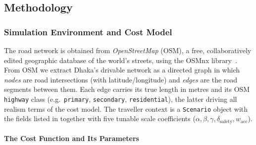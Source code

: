 \documentclass{ai-lab-report}
\begin{document}
\subsection{Methodology}

\subsubsection{Simulation Environment and Cost Model}
The road network is obtained from \emph{OpenStreetMap} (OSM), a free, collaboratively edited geographic database of the world's streets, using the \textsf{OSMnx} library~\citep{boeing2017osmnx}. From OSM we extract Dhaka's drivable network as a directed graph in which \emph{nodes} are road intersections (with latitude/longitude) and \emph{edges} are the road segments between them. Each edge carries its true length in metres and its OSM \texttt{highway} class (e.g.\ \texttt{primary}, \texttt{secondary}, \texttt{residential}), the latter driving all realism terms of the cost model. The traveller context is a \texttt{Scenario} object with the fields listed in  together with five tunable scale coefficients ($\alpha,\beta,\gamma,\delta_{\text{safety}},w_{\text{acc}}$).

\paragraph{The Cost Function and Its Parameters}
\label{sec:a1cost}
\end{document}
